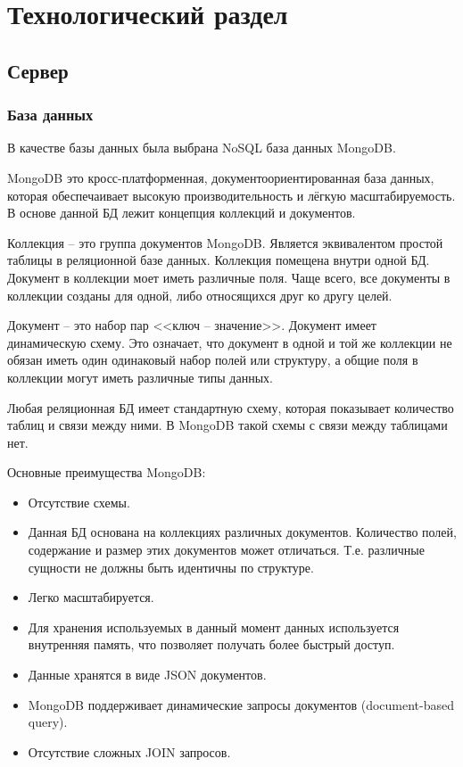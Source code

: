 \chapter{Технологический раздел}



\section{Сервер}

\subsection{База данных}
В качестве базы данных была выбрана NoSQL база данных MongoDB.

MongoDB это кросс-платформенная, документоориентированная база данных, которая обеспечаивает высокую производительность и лёгкую масштабируемость. В основе данной БД лежит  концепция коллекций и документов.

Коллекция – это группа документов MongoDB. Является эквивалентом простой таблицы в реляционной базе данных. Коллекция помещена внутри одной БД. Документ в коллекции моет иметь различные поля. Чаще всего, все документы в коллекции созданы для одной, либо относящихся друг ко другу целей.

Документ – это набор пар <<ключ – значение>>. Документ имеет динамическую схему. Это означает, что документ в одной и той же коллекции не обязан иметь один одинаковый набор полей или структуру, а общие поля в коллекции могут иметь различные типы данных.

Любая реляционная БД имеет стандартную схему, которая показывает количество таблиц и связи между ними. В MongoDB такой схемы с связи между таблицами нет.

Основные преимущества MongoDB:

\begin{itemize}
	\item Отсутствие схемы.
	\item Данная БД основана на коллекциях различных документов. Количество полей, содержание и размер этих документов может отличаться. Т.е. различные сущности не должны быть идентичны по структуре.
	\item Легко масштабируется.
	\item Для хранения используемых в данный момент данных используется внутренняя память, что позволяет получать более быстрый доступ.
	\item Данные хранятся в виде JSON документов.
	\item MongoDB поддерживает динамические запросы документов (document-based query).
	\item Отсутствие сложных JOIN запросов.
\end{itemize}

